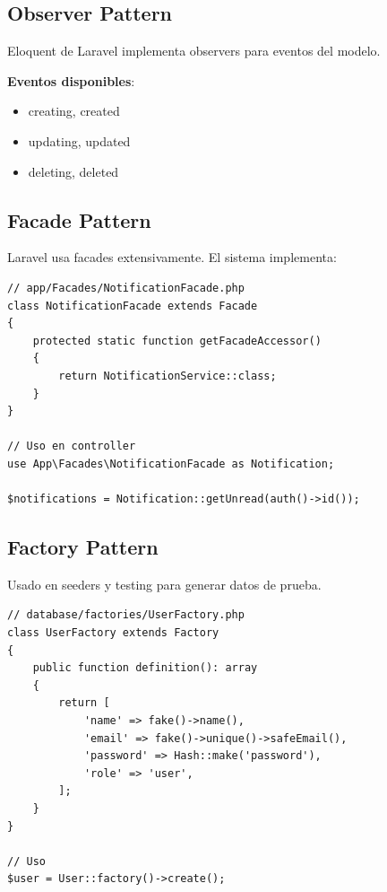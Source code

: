 \documentclass[12pt,a4paper]{article}
\begin{document}
\subsection{Observer Pattern}

Eloquent de Laravel implementa observers para eventos del modelo.

\textbf{Eventos disponibles}:
\begin{itemize}
    \item creating, created
    \item updating, updated
    \item deleting, deleted
\end{itemize}

\subsection{Facade Pattern}

Laravel usa facades extensivamente. El sistema implementa:

\begin{lstlisting}[caption={Facades Personalizados}, style=phpstyle, label=lst:facades]
// app/Facades/NotificationFacade.php
class NotificationFacade extends Facade
{
    protected static function getFacadeAccessor()
    {
        return NotificationService::class;
    }
}

// Uso en controller
use App\Facades\NotificationFacade as Notification;

$notifications = Notification::getUnread(auth()->id());
\end{lstlisting}

\subsection{Factory Pattern}

Usado en seeders y testing para generar datos de prueba.

\begin{lstlisting}[caption={User Factory}, style=phpstyle, label=lst:factory]
// database/factories/UserFactory.php
class UserFactory extends Factory
{
    public function definition(): array
    {
        return [
            'name' => fake()->name(),
            'email' => fake()->unique()->safeEmail(),
            'password' => Hash::make('password'),
            'role' => 'user',
        ];
    }
}

// Uso
$user = User::factory()->create();
\end{lstlisting}
\end{document}
